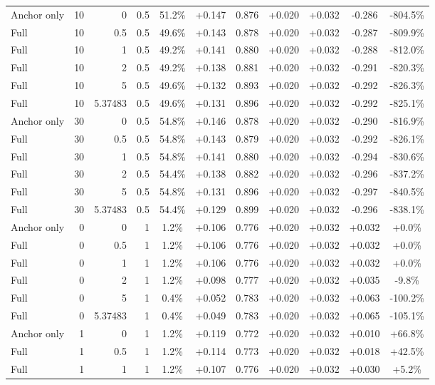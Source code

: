 \begin{table}[htbp]
\begin{tabular}{lrrrccccccc}
Anchor only & 10 & 0 & 0.5 & 51.2\% & +0.147 & 0.876 & +0.020 & +0.032 & -0.286 & -804.5\% \\
Full & 10 & 0.5 & 0.5 & 49.6\% & +0.143 & 0.878 & +0.020 & +0.032 & -0.287 & -809.9\% \\
Full & 10 & 1 & 0.5 & 49.2\% & +0.141 & 0.880 & +0.020 & +0.032 & -0.288 & -812.0\% \\
Full & 10 & 2 & 0.5 & 49.2\% & +0.138 & 0.881 & +0.020 & +0.032 & -0.291 & -820.3\% \\
Full & 10 & 5 & 0.5 & 49.6\% & +0.132 & 0.893 & +0.020 & +0.032 & -0.292 & -826.3\% \\
Full & 10 & 5.37483 & 0.5 & 49.6\% & +0.131 & 0.896 & +0.020 & +0.032 & -0.292 & -825.1\% \\
Anchor only & 30 & 0 & 0.5 & 54.8\% & +0.146 & 0.878 & +0.020 & +0.032 & -0.290 & -816.9\% \\
Full & 30 & 0.5 & 0.5 & 54.8\% & +0.143 & 0.879 & +0.020 & +0.032 & -0.292 & -826.1\% \\
Full & 30 & 1 & 0.5 & 54.8\% & +0.141 & 0.880 & +0.020 & +0.032 & -0.294 & -830.6\% \\
Full & 30 & 2 & 0.5 & 54.4\% & +0.138 & 0.882 & +0.020 & +0.032 & -0.296 & -837.2\% \\
Full & 30 & 5 & 0.5 & 54.8\% & +0.131 & 0.896 & +0.020 & +0.032 & -0.297 & -840.5\% \\
Full & 30 & 5.37483 & 0.5 & 54.4\% & +0.129 & 0.899 & +0.020 & +0.032 & -0.296 & -838.1\% \\
Anchor only & 0 & 0 & 1 & 1.2\% & +0.106 & 0.776 & +0.020 & +0.032 & +0.032 & +0.0\% \\
Full & 0 & 0.5 & 1 & 1.2\% & +0.106 & 0.776 & +0.020 & +0.032 & +0.032 & +0.0\% \\
Full & 0 & 1 & 1 & 1.2\% & +0.106 & 0.776 & +0.020 & +0.032 & +0.032 & +0.0\% \\
Full & 0 & 2 & 1 & 1.2\% & +0.098 & 0.777 & +0.020 & +0.032 & +0.035 & -9.8\% \\
Full & 0 & 5 & 1 & 0.4\% & +0.052 & 0.783 & +0.020 & +0.032 & +0.063 & -100.2\% \\
Full & 0 & 5.37483 & 1 & 0.4\% & +0.049 & 0.783 & +0.020 & +0.032 & +0.065 & -105.1\% \\
Anchor only & 1 & 0 & 1 & 1.2\% & +0.119 & 0.772 & +0.020 & +0.032 & +0.010 & +66.8\% \\
Full & 1 & 0.5 & 1 & 1.2\% & +0.114 & 0.773 & +0.020 & +0.032 & +0.018 & +42.5\% \\
Full & 1 & 1 & 1 & 1.2\% & +0.107 & 0.776 & +0.020 & +0.032 & +0.030 & +5.2\% \\

\end{tabular}
\end{table}
